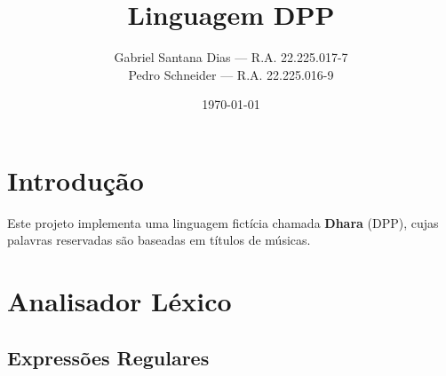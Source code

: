 \documentclass[a4paper,12pt]{article}
\title{\textbf{Linguagem DPP}}
\author{
    Gabriel Santana Dias --- R.A. 22.225.017-7\\
    Pedro Schneider \phantom{Dias} --- R.A. 22.225.016-9
}
\date{\today}
\begin{document}
\maketitle

\tableofcontents
\newpage

\section{Introdução}
Este projeto implementa uma linguagem fictícia chamada \textbf{Dhara} (DPP), cujas palavras reservadas são baseadas em títulos de músicas.

\section{Analisador Léxico}
\subsection{Expressões Regulares}
\end{document}
